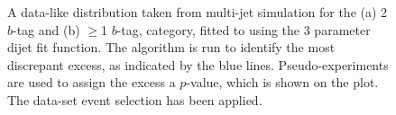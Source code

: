 \begin{figure}[!ht]
  \begin{center}
   \captionsetup[subfigure]{aboveskip=0pt,justification=centering}
  \end{center}
  \caption{A data-like distribution taken from multi-jet simulation for the (a) 2 $b$-tag and (b) $\geq$1 $b$-tag,
    category, fitted to using the 3 parameter dijet fit function.
    The \bh{} algorithm is run to identify the most discrepant excess, as indicated by the blue lines.
    Pseudo-experiments are used to assign the excess a \mbox{$p$-value}, which is shown on the plot.
    The \summer{} data-set event selection has been applied.}
  \label{fig:DataLikeSearchPhase}
\end{figure}

